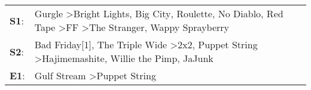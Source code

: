 \begin{supertabular}{p{0.03\textwidth}p{0.92\textwidth}}
 \textbf{S1}:  &  Gurgle\textsuperscript{} \textgreater \enspace Bright Lights, Big City\textsuperscript{}, \enspace Roulette\textsuperscript{}, \enspace No Diablo\textsuperscript{}, \enspace Red Tape\textsuperscript{} \textgreater \enspace FF\textsuperscript{} \textgreater \enspace The Stranger\textsuperscript{}, \enspace Wappy Sprayberry\textsuperscript{}  \enspace  \\
 \textbf{S2}:  &                                                 Bad Friday[1]\textsuperscript{}, \enspace The Triple Wide\textsuperscript{} \textgreater \enspace 2x2\textsuperscript{}, \enspace Puppet String\textsuperscript{} \textgreater \enspace Hajimemashite\textsuperscript{}, \enspace Willie the Pimp\textsuperscript{}, \enspace JaJunk\textsuperscript{}  \enspace  \\
 \textbf{E1}:  &                                                                                                                                                                                                                                                                    Gulf Stream\textsuperscript{} \textgreater \enspace Puppet String\textsuperscript{}  \enspace  \\
\end{supertabular}
